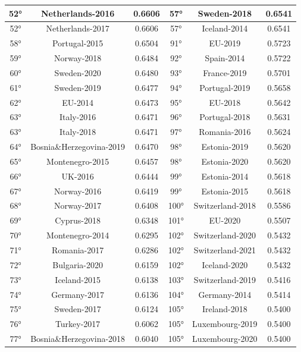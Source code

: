 \documentclass[a4paper,12pt, openright]{report}
\begin{document}
\begin{longtable}[c]{|c|c|c|c|c|c|}
    \hline
    52° & Netherlands-2016 & 0.6606 & 57° & Sweden-2018 & 0.6541 \\
    \hline
    52° & Netherlands-2017 & 0.6606 & 57° & Iceland-2014 & 0.6541 \\
    \hline
    58° & Portugal-2015 & 0.6504 & 91° & EU-2019 & 0.5723 \\ 
    \hline
    59° & Norway-2018 & 0.6484 & 92° & Spain-2014 & 0.5722 \\
    \hline
    60° & Sweden-2020 & 0.6480 & 93° & France-2019 & 0.5701 \\
    \hline
    61° & Sweden-2019  & 0.6477 & 94° & Portugal-2019 & 0.5658 \\
    \hline
    62° & EU-2014 & 0.6473 & 95° & EU-2018 & 0.5642 \\
    \hline
    63° & Italy-2016 & 0.6471 & 96° & Portugal-2018  & 0.5631 \\ 
    \hline
    63° & Italy-2018 & 0.6471 & 97° & Romania-2016 & 0.5624 \\ 
    \hline
    64° & Bosnia\&Herzegovina-2019 & 0.6470 & 98° & Estonia-2019 & 0.5620 \\
    \hline
    65° & Montenegro-2015 & 0.6457 & 98° & Estonia-2020 & 0.5620 \\
    \hline
    66° & UK-2016  & 0.6444 & 99° & Estonia-2014 & 0.5618 \\ 
    \hline
    67° & Norway-2016 & 0.6419 & 99° & Estonia-2015 & 0.5618 \\ 
    \hline
    68° & Norway-2017 & 0.6408 & 100° & Switzerland-2018  & 0.5586 \\
    \hline
    69° & Cyprus-2018 & 0.6348 & 101° & EU-2020 & 0.5507 \\
    \hline
    70° & Montenegro-2014 & 0.6295 & 102° & Switzerland-2020 & 0.5432 \\
    \hline
    71° & Romania-2017 & 0.6286 & 102° & Switzerland-2021 & 0.5432 \\
    \hline
    72° & Bulgaria-2020 & 0.6159 & 102° & Iceland-2020 & 0.5432 \\
    \hline
    73° & Iceland-2015 & 0.6138 & 103° & Switzerland-2019 & 0.5416 \\
    \hline
    74° & Germany-2017 & 0.6136 & 104° & Germany-2014  & 0.5414 \\
    \hline
    75° & Sweden-2017 & 0.6124 & 105° & Ireland-2018 & 0.5400 \\
    \hline
    76° & Turkey-2017 & 0.6062 & 105° & Luxembourg-2019 & 0.5400 \\
    \hline
    77° & Bosnia\&Herzegovina-2018 & 0.6040 & 105° & Luxembourg-2020 & 0.5400 \\

\end{longtable}
\end{document}
